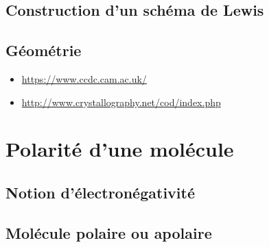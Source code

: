 \documentclass{beamer}
\begin{document}
\subsection{Construction d'un schéma de Lewis}
\subsection{Géométrie}

\begin{frame}
    \begin{itemize}
        \item     \url{https://www.ccdc.cam.ac.uk/}
        \item \url{http://www.crystallography.net/cod/index.php}
    \end{itemize}

\end{frame}
\section{Polarité d'une molécule}
\subsection{Notion d'électronégativité}
\subsection{Molécule polaire ou apolaire}
\end{document}
